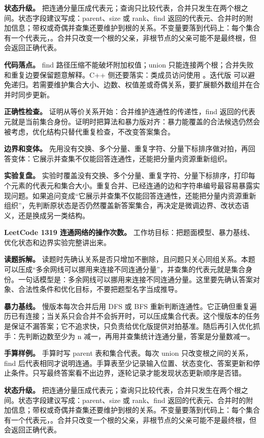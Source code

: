 \textbf{状态升级。} 把连通分量压成代表元；查询只比较代表，合并只发生在两个根之间。状态字段建议写成：parent、size 或 rank、find 返回的代表元、合并时的附加信息；带权或奇偶并查集还要维护到根的关系。不变量要落到代码上：每个集合有一个代表元，。合并只改变一个根的父亲，非根节点的父亲可能不是最终根，但  会返回正确代表。

\textbf{代码落点。} find 路径压缩不能破坏附加权值；union 只能连接两个根；合并失败和重复边要保留题意解释。C++ 侧还要落实：类成员访问使用 。迭代版  可以避免递归。若需要维护集合大小、边数、权值差或奇偶关系，要扩展额外数组并在合并时同步更新。

\textbf{正确性检查。} 证明从等价关系开始：合并维护连通性的传递性，find 返回的代表元就是当前集合身份。证明时把算法和暴力版对齐：暴力能覆盖的合法候选仍然会被考虑，优化结构只替代重复检查，不改变答案集合。

\textbf{边界和变体。} 先用没有交换、多个分量、重复字符、分量下标排序做对拍，再回答变体：它展示并查集不仅能回答连通性，还能把分量内资源重新组织。

\textbf{实验复盘。} 实验时覆盖没有交换、多个分量、重复字符、分量下标排序，打印每个元素的代表元和集合大小。重复合并、已经连通的边和字符串编号最容易暴露实现问题。如果追问变成“它展示并查集不仅能回答连通性，还能把分量内资源重新组织”，先判断原状态是否仍然覆盖新答案集合，再决定是微调边界、改状态语义，还是换成另一类结构。

\noindent\textbf{LeetCode 1319 连通网络的操作次数。} 工作坊目标：把题面模型、暴力基线、优化状态和边界实验完整讲出来。

\textbf{读题拆解。} 读题时先确认关系是否只增加不删除，且问题只关心同组关系。本题可以压成“多余网线可以挪用来连接不同连通分量”，并查集的代表元就是集合身份。一句话模型是：多余网线可以挪用来连接不同连通分量。这里要先确认答案对象、合法性条件和优化目标，不要把题型名字当成推导。

\textbf{暴力基线。} 慢版本每次合并后用 DFS 或 BFS 重新判断连通性。它正确但重复遍历已有连接；当关系只会合并不会拆开时，可以压成集合代表。这个慢版本的任务是保证不漏答案；它不追求快，只负责给优化版提供对拍基准。随后再引入优化抓手：先判断边数至少为 n 减一，再用并查集统计连通分量，答案是分量数减一。

\textbf{手算样例。} 手算时写 parent 表和集合代表。每次 union 只改变根之间的关系，find 后代表相同才说明连通。手算表至少记录输入位置、状态变化、答案更新和停止条件。只写最终答案看不出边界，逐轮记录才能发现状态更新顺序是否错。

\textbf{状态升级。} 把连通分量压成代表元；查询只比较代表，合并只发生在两个根之间。状态字段建议写成：parent、size 或 rank、find 返回的代表元、合并时的附加信息；带权或奇偶并查集还要维护到根的关系。不变量要落到代码上：每个集合有一个代表元，。合并只改变一个根的父亲，非根节点的父亲可能不是最终根，但  会返回正确代表。

